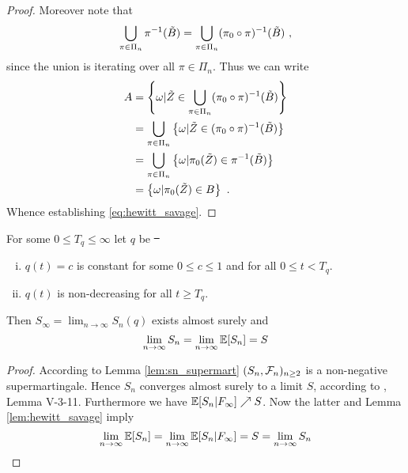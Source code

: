 \begin{lemma}
\begin{proof}
		Moreover note that 
		$$\bigcup\limits_{\pi\in\Pi_n}\pi^{-1}(\tilde{B}) = \bigcup\limits_{\pi\in\Pi_n}(\pi_0\circ\pi)^{-1}(\tilde{B})\textrm{ ,}$$
		since the union is iterating over all $\pi\in\Pi_n$. Thus we can write
		\begin{align*}
		A &= \left\{\omega | \tilde{Z} \in \bigcup\limits_{\pi\in\Pi_n}(\pi_0\circ\pi)^{-1}(\tilde{B})\right\}\\
		&= \bigcup\limits_{\pi\in\Pi_n}\left\{\omega | \tilde{Z} \in (\pi_0\circ\pi)^{-1}(\tilde{B})\right\}\\
		&= \bigcup\limits_{\pi\in\Pi_n}\left\{\omega | \pi_0(\tilde{Z}) \in \pi^{-1}(\tilde{B})\right\}\\
		&= \left\{\omega | \pi_0(\tilde{Z}) \in B\right\}\textrm{ .}
		\end{align*}		
		Whence establishing \eqref{eq:hewitt_savage}.
	\end{proof}
\end{lemma}
%
\begin{thm}\label{thm:ex_limit_sn}
	For some $0\leq T_q\leq \infty$ let $q$ be \st\ 
	\begin{enumerate}[(i)]
		\item $q(t) = c$ is constant for some $0\leq c \leq1$ and for all $0\leq t< T_q$. 
		\item $q(t)$ is non-decreasing for all $t \geq T_q$. 
	\end{enumerate} 
	Then $S_\infty = \lim_{n\to\infty} S_n(q)$ exists almost surely and 
	$$\lim\limits_{n\to\infty} S_n = \lim\limits_{n\to\infty} \mathbb{E}[S_n] = S$$
	\begin{proof}
		According to Lemma \ref{lem:sn_supermart} $(S_n,\mathcal{F}_n)_{n\geq 2}$ is a non-negative supermartingale. Hence $S_n$ converges almost surely to a limit $S$, according to \cite{neveu1975discrete}, Lemma V-3-11. Furthermore we have $\mathbb{E}[S_n|F_\infty] \nearrow S$. Now the latter and Lemma \ref{lem:hewitt_savage} imply
		$$\lim\limits_{n\to\infty}\mathbb{E}[S_n] = \lim\limits_{n\to\infty}\mathbb{E}[S_n|F_\infty] = S = \lim\limits_{n\to\infty}S_n$$		
	\end{proof}
\end{thm}
%